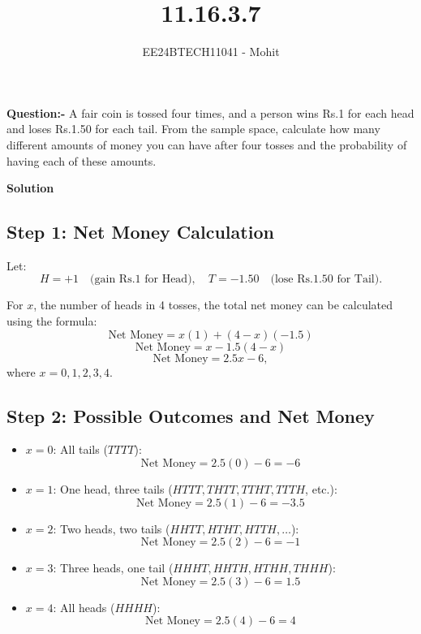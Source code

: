 \documentclass[journal]{IEEEtran}
\numberwithin{equation}{enumi}
\numberwithin{figure}{enumi}
\begin{document}

\title{11.16.3.7}
\author{EE24BTECH11041 - Mohit}
{\let\newpage\relax\maketitle}
\textbf{Question:-} A fair coin is tossed four times, and a person wins Rs.1 for each head and loses Rs.1.50 for each tail. From the sample space, calculate how many different amounts of money you can have after four tosses and the probability of having each of these amounts.

\textbf{Solution}

\subsection*{Step 1: Net Money Calculation}

Let:
\[
H = +1 \quad \text{(gain Rs.1 for Head)}, \quad T = -1.50 \quad \text{(lose Rs.1.50 for Tail)}.
\]

For \( x \), the number of heads in 4 tosses, the total net money can be calculated using the formula:
\[
\text{Net Money} = x(1) + (4-x)(-1.5)
\]
\[
\text{Net Money} = x - 1.5(4-x)
\]
\[
\text{Net Money} = 2.5x - 6,
\]
where \( x = 0, 1, 2, 3, 4 \).

\subsection*{Step 2: Possible Outcomes and Net Money}

\begin{itemize}
    \item \( x = 0 \): All tails (\( TTTT \)):
    \[
    \text{Net Money} = 2.5(0) - 6 = -6
    \]
    \item \( x = 1 \): One head, three tails (\( HTTT, THTT, TTHT, TTTH \), etc.):
    \[
    \text{Net Money} = 2.5(1) - 6 = -3.5
    \]
    \item \( x = 2 \): Two heads, two tails (\( HHTT, HTHT, HTTH, \dots \)):
    \[
    \text{Net Money} = 2.5(2) - 6 = -1
    \]
    \item \( x = 3 \): Three heads, one tail (\( HHHT, HHTH, HTHH, THHH \)):
    \[
    \text{Net Money} = 2.5(3) - 6 = 1.5
    \]
    \item \( x = 4 \): All heads (\( HHHH \)):
    \[
    \text{Net Money} = 2.5(4) - 6 = 4
    \]
\end{itemize}
\end{document}
